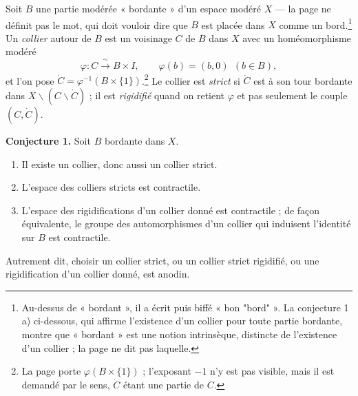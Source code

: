 \documentclass[11pt,a4paper]{article}
\begin{document}
Soit $B$ une partie modérée « bordante » d'un espace modéré $X$ — la page ne
définit pas le mot, qui doit vouloir dire que $B$ est placée dans $X$ comme un
bord.\footnote{Au-dessus de « bordant », il a écrit puis biffé « bon
"bord" ». La conjecture 1 a) ci-dessous, qui affirme l'existence d'un collier
pour toute partie bordante, montre que « bordant » est une notion intrinsèque,
distincte de l'existence d'un collier ; la page ne dit pas laquelle.}
Un \emph{collier} autour de $B$ est un voisinage $C$ de $B$ dans $X$ avec un
homéomorphisme modéré
\[
  \varphi \colon C \xrightarrow{\ \sim\ } B \times I, \qquad
  \varphi(b) = (b, 0) \ \ (b \in B),
\]
et l'on pose $\dot C = \varphi^{-1}(B \times \{1\})$.\footnote{La page porte
$\varphi(B \times \{1\})$ ; l'exposant $-1$ n'y est pas visible, mais il est
demandé par le sens, $\dot C$ étant une partie de $C$.} Le collier est
\emph{strict} si $\dot C$ est à son tour bordante dans
$X \smallsetminus (C \smallsetminus \dot C)$ ; il est \emph{rigidifié}
quand on retient $\varphi$ et pas seulement le couple $(C, \dot C)$.

\textbf{Conjecture 1.} Soit $B$ bordante dans $X$.
\begin{enumerate}
\item[a)] Il existe un collier, donc aussi un collier strict.
\item[b)] L'espace des colliers stricts est contractile.
\item[c)] L'espace des rigidifications d'un collier donné est contractile ;
  de façon équivalente, le groupe des automorphismes d'un collier qui
  induisent l'identité sur $B$ est contractile.
\end{enumerate}
Autrement dit, choisir un collier strict, ou un collier strict rigidifié, ou
une rigidification d'un collier donné, est anodin.
\end{document}
